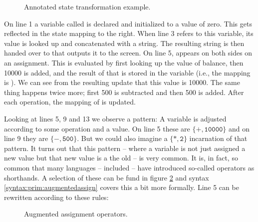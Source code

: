 \begin{figure}[tbp]
  
  \caption{Annotated state transformation example.}
  \label{fig:prim:int:csharp:state:trans}
\end{figure}

On line 1 a  variable called  is declared and initialized to a value of zero. This gets reflected in the state mapping to the right. When line 3 refers to this variable, its value is looked up and concatenated with a string. The resulting string is then handed over to  that outputs it to the screen. On line 5,  appears on both sides on an assignment. This is evaluated by first looking up the value of balance, then 10000 is added, and the result of that is stored in the variable (i.e., the mapping is ). We can see from the resulting update that this value is 10000. The same thing happens twice more; first 500 is subtracted and then 500 is added. After each operation, the mapping of  is updated.

Looking at lines 5, 9 and 13 we observe a pattern: A variable is adjusted according to some operation and a value. On line 5 these are $\{\mathtt{+},\mathtt{10000}\}$ and on line 9 they are $\{\mathtt{-},\mathtt{500}\}$. But we could also imagine a $\{\mathtt{*},\mathtt{2}\}$ incarnation of that pattern. It turns out that this pattern -- where a variable is not just assigned a new value but that new value is a  the old -- is very common. It is, in fact, so common that many languages -- \csharp included -- have introduced so-called  operators as shorthands. A selection of these can be fund in figure \ref{fig:prim:augmented} and syntax \ref{syntax:prim:augmentedassign} covers this a bit more formally. Line 5 can be rewritten according to these rules:

\begin{figure}[tbp]
  
  \caption{Augmented assignment operators.}
  \label{fig:prim:augmented}
\end{figure}

\begin{syntaxfloat}
  
  \caption{Augmented assignment operators.}
  \label{syntax:prim:augmentedassign}
\end{syntaxfloat}

